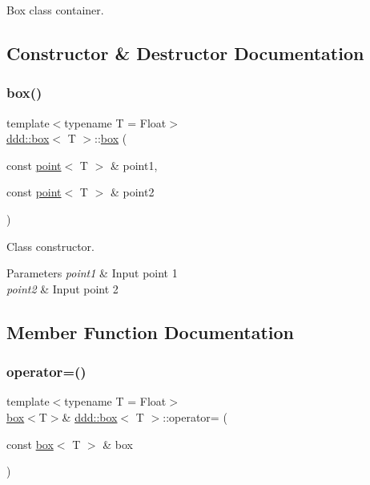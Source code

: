 Box class container. 

\subsection{Constructor \& Destructor Documentation}
\mbox{\label{classddd_1_1box_afb3bf0799aac08e5b58dbb955be99a78}} 
\subsubsection{\texorpdfstring{box()}{box()}}
{\footnotesize\ttfamily template$<$typename T = Float$>$ \\
\hyperlink{classddd_1_1box}{ddd\+::box}$<$ T $>$\+::\hyperlink{classddd_1_1box}{box} (\begin{DoxyParamCaption}\item[{const \hyperlink{classddd_1_1point}{point}$<$ T $>$ \&}]{point1,  }\item[{const \hyperlink{classddd_1_1point}{point}$<$ T $>$ \&}]{point2 }\end{DoxyParamCaption})\hspace{0.3cm}{\ttfamily [inline]}}



Class constructor. 


\begin{DoxyParams}{Parameters}
{\em point1} & Input point 1 \\
\hline
{\em point2} & Input point 2 \\
\hline
\end{DoxyParams}


\subsection{Member Function Documentation}
\mbox{\label{classddd_1_1box_a80ec0210ef2e3bcb0cd8e22e77f5c89d}} 
\subsubsection{\texorpdfstring{operator=()}{operator=()}}
{\footnotesize\ttfamily template$<$typename T = Float$>$ \\
\hyperlink{classddd_1_1box}{box}$<$T$>$\& \hyperlink{classddd_1_1box}{ddd\+::box}$<$ T $>$\+::operator= (\begin{DoxyParamCaption}\item[{const \hyperlink{classddd_1_1box}{box}$<$ T $>$ \&}]{box }\end{DoxyParamCaption})\hspace{0.3cm}{\ttfamily [inline]}}



